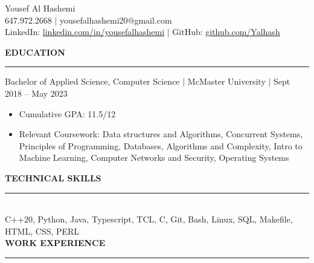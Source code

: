 \documentclass[12pt]{article}
\newcommand{\sectionRule}{\textcolor{gray}{\rule{7.27in}{0.02cm}}}
\newcommand{\sectionTxt}[1]{\noindent\textbf{#1}\\}
\newcommand{\textDate}[3]{\noindent#1 $|$ #2 $|$ {\color{textGray} #3}}
\begin{document}
    \begin{center}
        {\huge Yousef Al Hashemi}\\
        {\normalsize 647.972.2668 $|$ yousefalhashemi20@gmail.com}\\
        {\normalsize LinkedIn: \href{https://www.linkedin.com/in/yousefalhashemi}{linkedin.com/in/yousefalhashemi} $|$ GitHub: \href{https://github.com/Yalhash}{github.com/Yalhash}}\\
    \end{center}

    \sectionTxt{EDUCATION}
    \sectionRule

    \textDate{Bachelor of Applied Science, Computer Science}{McMaster University}{Sept 2018 -- May 2023}
    \begin{small}
        \begin{itemize}
            \itemsep0em 
            \item Cumulative GPA: {\color{textGray} 11.5/12}
            \item Relevant Coursework: {\color{textGray} Data structures and Algorithms, Concurrent Systems, Principles of Programming, Databases, Algorithms and Complexity, Intro to Machine Learning, Computer Networks and Security, Operating Systems}
        \end{itemize}
    \end{small}

    \sectionTxt{TECHNICAL SKILLS}
    \sectionRule \\


    {\color{textGray}C++20, Python, Java, Typescript, TCL, C, Git, Bash, Linux, SQL, Makefile, HTML, CSS, PERL} \\


    \sectionTxt{WORK EXPERIENCE}
    \sectionRule
\end{document}
